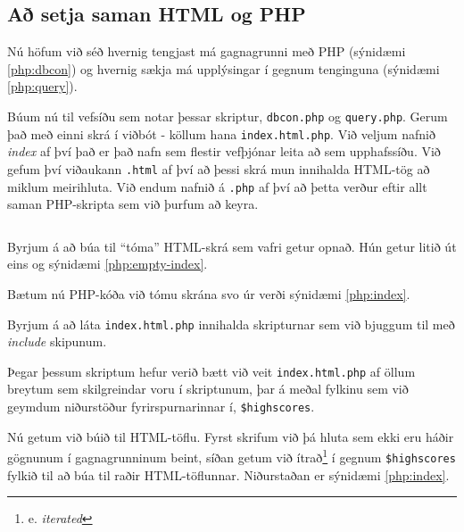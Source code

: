\begin{example}
\caption[Upplýsingar sóttar úr gagnagrunni með PHP]{PDO notað til að sækja upplýsingar úr gagnagrunni og geyma þær í fylkinu \emph{\$highscore}. Athugum að breytan \emph{\$dbh} þarf að vera skilgreind þegar þessi skripta er keyrð, sjá undirkafla \ref{undirkafli:html+php}. Vistum skriptuna í skrá sem við köllum \emph{query.php}.}
\label{php:query}
\centering
\inputminted[frame=lines, fontfamily=courier]{php}{php/query.php}
\end{example}

\subsection{Að setja saman HTML og PHP}
\label{undirkafli:html+php}
Nú höfum við séð hvernig tengjast má gagnagrunni með PHP (sýnidæmi \ref{php:dbcon}) og hvernig sækja má upplýsingar í gegnum tenginguna (sýnidæmi \ref{php:query}).

Búum nú til vefsíðu sem notar þessar skriptur, \verb|dbcon.php| og \verb|query.php|. Gerum það með einni skrá í viðbót - köllum hana \verb|index.html.php|. Við veljum nafnið \emph{index} af því það er það nafn sem flestir vefþjónar leita að sem upphafssíðu. Við gefum því viðaukann \verb|.html| af því að þessi skrá mun innihalda HTML-tög að miklum meirihluta. Við endum nafnið á \verb|.php| af því að þetta verður eftir allt saman PHP-skripta sem við þurfum að keyra.

\begin{example}
\caption[HTML-beinagrind]{HTML beinagrind. Þetta er tóm síða.}
\label{php:empty-index}
\centering
\inputminted[frame=lines, fontfamily=courier]{html}{php/empty-index.html}
\end{example}

Byrjum á að búa til ``tóma'' HTML-skrá sem vafri getur opnað. Hún getur litið út eins og sýnidæmi \ref{php:empty-index}.

Bætum nú PHP-kóða við tómu skrána svo úr verði sýnidæmi \ref{php:index}. 

Byrjum á að láta \verb|index.html.php| innihalda skripturnar sem við bjuggum til með \emph{include} skipunum.

Þegar þessum skriptum hefur verið bætt við veit \verb|index.html.php| af öllum breytum sem skilgreindar voru í skriptunum, þar á meðal fylkinu sem við geymdum niðurstöður fyrirspurnarinnar í, \verb|$highscores|. 

Nú getum við búið til HTML-töflu. Fyrst skrifum við þá hluta sem ekki eru háðir gögnunum í gagnagrunninum beint, síðan getum við ítrað\footnote{e. \emph{iterated}} í gegnum \verb|$highscores| fylkið til að búa til raðir HTML-töflunnar. Niðurstaðan er sýnidæmi \ref{php:index}.

